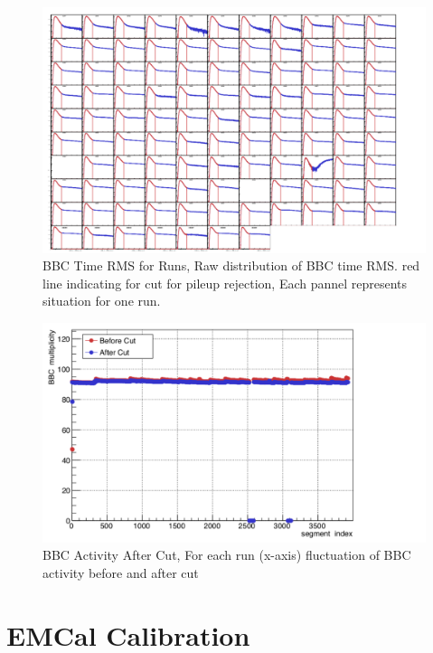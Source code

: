 \documentclass{article}
\begin{document}
\begin{figure}[!htb]
  \centering  
    \includegraphics[width=\textwidth]{fig_pi0vn/bbc_timingrms_runs.png}
  \caption[BBC Time RMS for Runs]{BBC Time RMS for Runs, Raw distribution of BBC time RMS. red line indicating for cut for pileup rejection, Each pannel represents situation for one run.}
  \label{fig:BBC Time RMS for Runs}
\end{figure}

\begin{figure}[!htb]
  \centering  
    \includegraphics[width=\textwidth]{fig_pi0vn/bbc_activity_aftercut.png}
  \caption[BBC Activity After Cut]{BBC Activity After Cut, For each run (x-axis) fluctuation of BBC activity before and after cut}
  \label{fig:BBC Activity After Cut}
\end{figure}

\section{EMCal Calibration}
\end{document}
